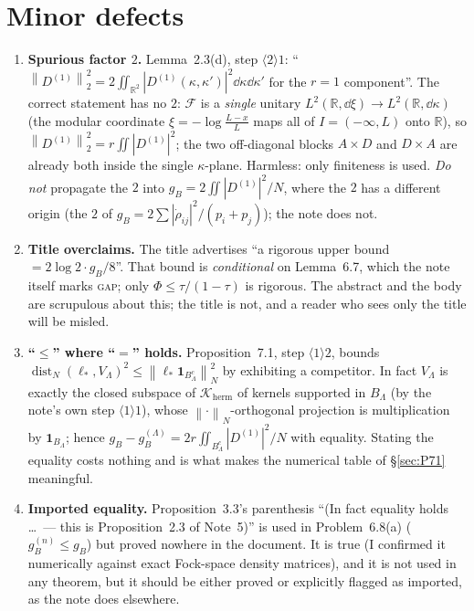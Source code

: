 \documentclass[11pt]{article}
\newcommand{\norm}[1]{\left\lVert #1\right\rVert}
\newcommand{\abs}[1]{\left|#1\right|}
\newcommand{\one}{\mathbf 1}
\theoremstyle{definition}\newtheorem{problem}[theorem]{Problem}
\begin{document}
\section{Minor defects}\label{sec:minor}

\begin{enumerate}[label=(M\arabic*),leftmargin=3em]
\item \textbf{Spurious factor \(2\).}  Lemma~2.3(d), step \(\langle2\rangle1\):
 ``\(\norm{D^{(1)}}_2^2=2\iint_{\mathbb R^2}\abs{D^{(1)}(\kappa,\kappa')}^2\dd\kappa\dd\kappa'\) for
 the \(r=1\) component''.  The correct statement has no \(2\): \(\mathcal F\) is a \emph{single}
 unitary \(L^2(\mathbb R,\dd\xi)\to L^2(\mathbb R,\dd\kappa)\) (the modular coordinate
 \(\xi=-\log\frac{L-x}L\) maps all of \(I=(-\infty,L)\) onto \(\mathbb R\)), so
 \(\norm{D^{(1)}}_2^2=r\iint\abs{D^{(1)}}^2\); the two off-diagonal blocks \(A\times D\) and
 \(D\times A\) are already both inside the single \(\kappa\)-plane.  Harmless: only finiteness is
 used.  \emph{Do not} propagate the \(2\) into \(g_B=2\iint\abs{D^{(1)}}^2/N\), where the \(2\) has
 a different origin (the \(2\) of \(g_B=2\sum\abs{\dot\rho_{ij}}^2/(p_i+p_j)\)); the note does not.
\item \textbf{Title overclaims.}  The title advertises ``a rigorous upper bound
 \(=2\log2\cdot g_B/8\)''.  That bound is \emph{conditional} on Lemma~6.7, which the note itself
 marks \textsc{gap}; only \(\Phi\le\tau/(1-\tau)\) is rigorous.  The abstract and the body are
 scrupulous about this; the title is not, and a reader who sees only the title will be misled.
\item \textbf{``\(\le\)'' where ``\(=\)'' holds.}  Proposition~7.1, step \(\langle1\rangle2\), bounds
 \(\operatorname{dist}_N(\ell_*,V_\Lambda)^2\le\norm{\ell_*\one_{B_\Lambda^c}}_N^2\) by exhibiting a
 competitor.  In fact \(V_\Lambda\) is exactly the closed subspace of \(\mathcal K_{\mathrm{herm}}\)
 of kernels supported in \(B_\Lambda\) (by the note's own step \(\langle1\rangle1\)), whose
 \(\norm\cdot_N\)-orthogonal projection is multiplication by \(\one_{B_\Lambda}\); hence
 \(g_B-g_B^{(\Lambda)}=2r\iint_{B_\Lambda^c}\abs{D^{(1)}}^2/N\) with equality.  Stating the equality
 costs nothing and is what makes the numerical table of \S\ref{sec:P71} meaningful.
\item \textbf{Imported equality.}  Proposition~3.3's parenthesis ``(In fact equality holds \dots\ ---
 this is Proposition~2.3 of Note~5)'' is used in Problem~6.8(a) (\(g_B^{(n)}\le g_B\)) but proved
 nowhere in the document.  It is true (I confirmed it numerically against exact Fock-space density
 matrices), and it is not used in any theorem, but it should be either proved or explicitly flagged
 as imported, as the note does elsewhere.
\end{enumerate}
\end{document}
